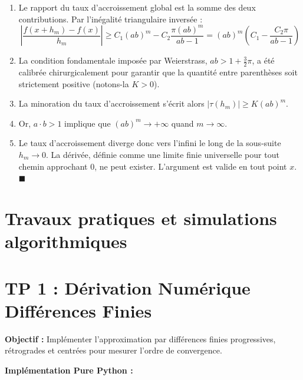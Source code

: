 \documentclass[11pt,a4paper]{article}
\begin{document}
\begin{enumerate}
\item Le rapport du taux d'accroissement global est la somme des deux contributions. Par l'inégalité triangulaire inversée :
   \[  \left| \frac{f(x+h_m) - f(x)}{h_m} \right| \geq C_1 (ab)^m - C_2 \frac{\pi (ab)^m}{ab-1} = (ab)^m \left( C_1 - \frac{C_2 \pi}{ab-1} \right)  \]
\item La condition fondamentale imposée par Weierstrass, $ab > 1 + \frac{3}{2}\pi$, a été calibrée chirurgicalement pour garantir que la quantité entre parenthèses soit strictement positive (notons-la $K > 0$).
\item La minoration du taux d'accroissement s'écrit alors $| \tau(h_m) | \geq K (ab)^m$.
\item Or, $a \cdot b > 1$ implique que $(ab)^m \to +\infty$ quand $m \to \infty$.
\item Le taux d'accroissement diverge donc vers l'infini le long de la sous-suite $h_m \to 0$. La dérivée, définie comme une limite finie universelle pour tout chemin approchant 0, ne peut exister. L'argument est valide en tout point $x$. $\blacksquare$
\end{enumerate}


\vspace{1em}


\newpage
\section{Travaux pratiques et simulations algorithmiques}

\section*{TP 1 : Dérivation Numérique Différences Finies}

\textbf{Objectif :}
Implémenter l'approximation par différences finies progressives, rétrogrades et centrées pour mesurer l'ordre de convergence.

\textbf{Implémentation Pure Python :}
\end{document}
